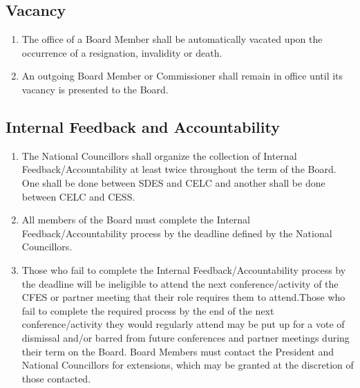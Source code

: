 \subsection{Vacancy}
\label{vacancy}

\begin{enumerate}
 \item
  The office of a Board Member shall be automatically vacated upon the occurrence of a resignation, invalidity or death.
 \item
  An outgoing Board Member or Commissioner shall remain in office until its vacancy is presented to the Board.
\end{enumerate}

\subsection{Internal Feedback and Accountability}
\label{internal-feedback-and-accountability}

\begin{enumerate}
 \item
  The National Councillors shall organize the collection of Internal Feedback/Accountability at least twice throughout the term of the Board. One shall be done between SDES and CELC and another shall be done between CELC and CESS.
 \item
  All members of the Board must complete the Internal Feedback/Accountability process by the deadline defined by the National Councillors.
 \item
  Those who fail to complete the Internal Feedback/Accountability process by the deadline will be ineligible to attend the next conference/activity of the CFES or partner meeting that their role requires them to attend.Those who fail to complete the required process by the end of the next conference/activity they would regularly attend may be put up for a vote of dismissal and/or barred from future conferences and partner meetings during their term on the Board. Board Members must contact the President and National Councillors for extensions, which may be granted at the discretion of those contacted.

\end{enumerate}
